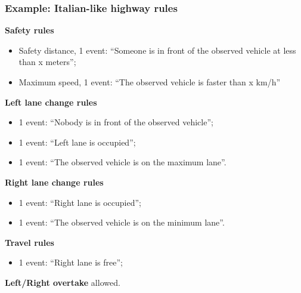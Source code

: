 \documentclass{beamer}
\begin{document}
\begin{frame}
\frametitle{Example: Italian-like highway rules}
\textbf{Safety rules}\\
\begin{itemize}
\item Safety distance, 1 event: ``Someone is in front of the observed vehicle at less than x meters'';
\item Maximum speed, 1 event: ``The observed vehicle is faster than x km/h''
\end{itemize}

\textbf{Left lane change rules}
\begin{itemize}
\item 1 event: ``Nobody is in front of the observed vehicle'';
\item 1 event: ``Left lane is occupied'';
\item 1 event: ``The observed vehicle is on the maximum lane''.
\end{itemize}

\textbf{Right lane change rules}
\begin{itemize}
\item 1 event: ``Right lane is occupied'';
\item 1 event: ``The observed vehicle is on the minimum lane''.
\end{itemize}

\textbf{Travel rules}
\begin{itemize}
\item 1 event: ``Right lane is free'';
\end{itemize}

\textbf{Left/Right overtake} allowed.
\end{frame}
\end{document}
